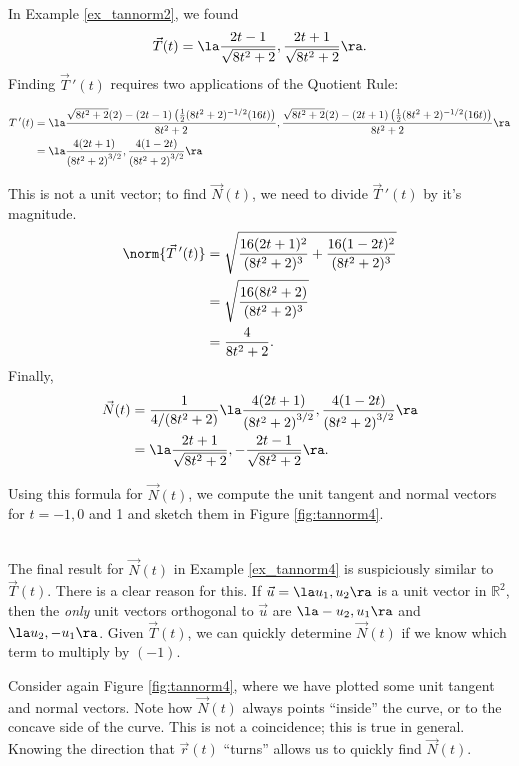 {In Example \ref{ex_tannorm2}, we found
$$\vec T(t) = \la \frac{2t-1}{\sqrt{8t^2+2}},\frac{2t+1}{\sqrt{8t^2+2}}\ra.$$
Finding $\vec T\,'(t)$ requires two applications of the Quotient Rule:

\begin{align*}
T\,'(t) &= \la \frac{\sqrt{8t^2+2}(2)-(2t-1)\left(\frac12(8t^2+2)^{-1/2}(16t)\right)}{8t^2+2}, \frac{\sqrt{8t^2+2}(2)-(2t+1)\left(\frac12(8t^2+2)^{-1/2}(16t)\right)}{8t^2+2} \ra \\
				&= \la \frac{4 (2 t+1)}{\left(8 t^2+2\right)^{3/2}},\frac{4
   (1-2 t)}{\left(8 t^2+2\right)^{3/2}}\ra
\end{align*}

This is not a unit vector; to find $\vec N(t)$, we need to divide $\vec T\,'(t)$ by it's magnitude.
\begin{align*}
\norm{\vec T\,'(t)} &= \sqrt{\frac{16(2t+1)^2}{(8t^2+2)^3}+\frac{16(1-2t)^2}{(8t^2+2)^3}}\\
					&= \sqrt{\frac{16(8t^2+2)}{(8t^2+2)^3}}\\
					&= \frac{4}{8t^2+2}.
\end{align*}
Finally, 
\begin{align*}
\vec N(t) &= \frac1{4/(8t^2+2)}\la \frac{4 (2 t+1)}{\left(8 t^2+2\right)^{3/2}},\frac{4
   (1-2 t)}{\left(8 t^2+2\right)^{3/2}}\ra\\
	&= \la \frac{2t+1}{\sqrt{8t^2+2}},-\frac{2t-1}{\sqrt{8t^2+2}}\ra.
\end{align*}

Using this formula for $\vec N(t)$, we compute the unit tangent and normal vectors for $t=-1,0$ and 1 and sketch them in Figure \ref{fig:tannorm4}.
}\\

The final 	result for $\vec N(t)$ in Example \ref{ex_tannorm4} is suspiciously similar to $\vec T(t)$. There is a clear reason for this. If $\vec u = \la u_1,u_2\ra $ is a unit vector in $\mathbb{R}^2$, then the \textit{only} unit vectors orthogonal to $\vec u$ are $\la -u_2,u_1\ra $ and $\la u_2,-u_1\ra$. Given $\vec T(t)$, we can quickly determine $\vec N(t)$ if we know which term to multiply by $(-1)$.

Consider again Figure \ref{fig:tannorm4}, where we have plotted some unit tangent and normal vectors. Note how $\vec N(t)$ always points ``inside'' the curve, or to the concave side of the curve. This is not a coincidence; this is true in general. Knowing the direction that $\vec r(t)$ ``turns'' allows us to quickly find $\vec N(t)$.


